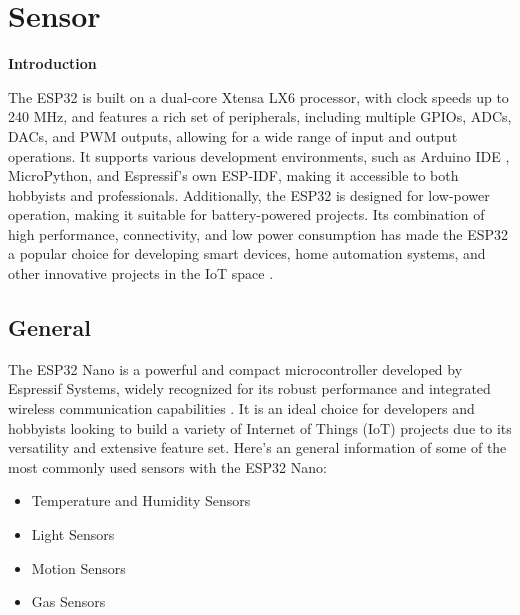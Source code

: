 %
%

\chapter{Sensor}

\textbf{Introduction} 

The ESP32 is built on a dual-core Xtensa LX6 processor, with clock speeds up to 240 MHz, and features a rich set of peripherals, including multiple GPIOs, ADCs, DACs, and PWM outputs, allowing for a wide range of input and output operations. It supports various development environments, such as Arduino IDE \cite{Bipasha:2018}, MicroPython, and Espressif's own ESP-IDF, making it accessible to both hobbyists and professionals. Additionally, the ESP32 is designed for low-power operation, making it suitable for battery-powered projects. Its combination of high performance, connectivity, and low power consumption has made the ESP32 a popular choice for developing smart devices, home automation systems, and other innovative projects in the IoT space \cite{Aquino:2021} .


\section{General}

The ESP32 Nano is a powerful and compact microcontroller developed by Espressif Systems, widely recognized for its robust performance and integrated wireless communication capabilities \cite{M:2021}. It is an ideal choice for developers and hobbyists looking to build a variety of Internet of Things (IoT) projects due to its versatility and extensive feature set.
Here's an general information of some of the most commonly used sensors with the ESP32 Nano\cite{Zulfiqar:2024}:

\begin{itemize}
	\item Temperature and Humidity Sensors
	\item Light Sensors
	\item Motion Sensors
	\item Gas Sensors

\end{itemize}

